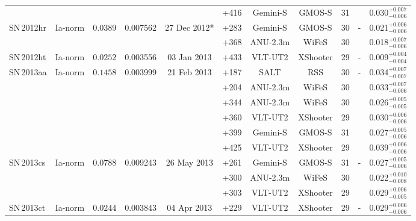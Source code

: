 \documentclass[fleqn,usenatbib]{mnras}
\begin{document}
\begin{table}
{\begin{tabular}{l c c c c c c c c c c}
             &           &          &          &              & +416   & Gemini-S & GMOS-S        & 31&    & 0.030$^{+0.007}_{-0.006}$ \\
    SN\,2012hr & Ia-norm   & $0.0389$ & 0.007562 & 27 Dec 2012* & +283   & Gemini-S & GMOS-S        & 30& -  & 0.021$^{+0.006}_{-0.006}$ \\
             &           &          &          &              & +368   & ANU-2.3m & WiFeS         & 30&    & 0.018$^{+0.007}_{-0.006}$ \\
    SN\,2012ht & Ia-norm   & $0.0252$ & 0.003556 & 03 Jan 2013  & +433   & VLT-UT2  & XShooter     & 29& -  & 0.009$^{+0.004}_{-0.004}$ \\
    SN\,2013aa & Ia-norm   & $0.1458$ & 0.003999 & 21 Feb 2013  & +187   & SALT     & RSS           & 30& -  & 0.034$^{+0.007}_{-0.007}$ \\
             &           &          &          &              & +204   & ANU-2.3m & WiFeS         & 30&    & 0.033$^{+0.007}_{-0.006}$ \\
             &           &          &          &              & +344   & ANU-2.3m & WiFeS         & 30&    & 0.026$^{+0.005}_{-0.005}$ \\
             &           &          &          &              & +360   & VLT-UT2  & XShooter     & 29&    & 0.030$^{+0.006}_{-0.006}$ \\
             &           &          &          &              & +399   & Gemini-S & GMOS-S        & 31&    & 0.027$^{+0.005}_{-0.006}$ \\
             &           &          &          &              & +425   & VLT-UT2  & XShooter     & 29&    & 0.039$^{+0.006}_{-0.006}$ \\
    SN\,2013cs & Ia-norm   & $0.0788$ & 0.009243 & 26 May 2013  & +261   & Gemini-S & GMOS-S        & 31& -  & 0.027$^{+0.005}_{-0.006}$ \\
             &           &          &          &              & +300   & ANU-2.3m & WiFeS         & 30&    & 0.022$^{+0.010}_{-0.008}$ \\
             &           &          &          &              & +303   & VLT-UT2  & XShooter     & 29&    & 0.029$^{+0.006}_{-0.005}$ \\
    SN\,2013ct & Ia-norm   & $0.0244$ & 0.003843 & 04 Apr 2013  & +229   & VLT-UT2  & XShooter     & 29& -  & 0.029$^{+0.006}_{-0.006}$ \\

\end{tabular}}
\end{table}
\end{document}
